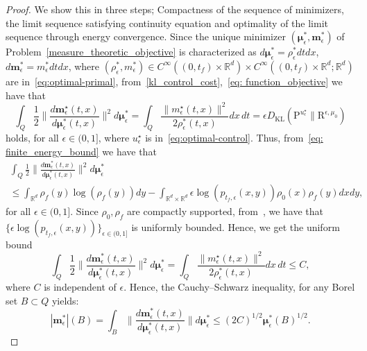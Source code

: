 \documentclass{amsart}
\numberwithin{equation}{section}
\newcommand{\R}{\mathbb{R}}
\newcommand{\KL}{D_{\mathrm{KL}}}
\begin{document}
\begin{proof}
 We show this in three steps; Compactness of the sequence of minimizers, the limit sequence satisfying continuity equation and optimality of the limit sequence through energy convergence. Since the unique minimizer $(\boldsymbol{\mu}_\epsilon^*, \mathbf{m}_\epsilon^*)$ of Problem~\eqref{measure_theoretic_objective} is characterized as $d\boldsymbol{\mu}_{\epsilon}^* = \rho_{\epsilon}^* dt dx$, $d\mathbf{m}_{\epsilon}^* = m_{\epsilon}^* dt dx$, where $(\rho_{\epsilon}^*,m_{\epsilon}^*)\in C^\infty((0,t_f)\times\R^d)\times C^\infty((0,t_f)\times\R^d;\R^d)$ are in~\eqref{eq:optimal-primal}, from~\eqref{kl_control_cost},~\eqref{eq: function_objective} we have that
\[
\int_Q \frac12\Big\|\frac{d\mathbf m_{\epsilon}^\star(t,x)}{d\boldsymbol\mu^*_\epsilon(t,x)}\Big\|^2 d\boldsymbol\mu^*_\epsilon=\int_Q  \frac{\|m_{\epsilon}^\star(t,x)\|^2}{2\rho_\epsilon^*(t,x)} dx\, dt =\epsilon\KL(\mathrm{P}^{u_\epsilon^\star} \| \mathrm{R}^{\epsilon,\mu_0})
\]
holds, for all $\epsilon\in (0,1]$, where $u_\epsilon^\star$ is in~\eqref{eq:optimal-control}. Thus, from~\eqref{eq: finite_energy_bound} we have that 
\begin{multline*}
\int_Q \frac12\Big\|\frac{d\mathbf m^*_\epsilon(t,x)}{d\boldsymbol\mu^*_\epsilon(t,x)}\Big\|^2 d\boldsymbol\mu^*_\epsilon\\\leq \int_{\R^d}\rho_f(y)\log(\rho_f(y))dy-\int_{\R^d\times\R^d}\epsilon\log(p_{t_f,\epsilon}(x,y))\rho_0(x)\rho_f(y)dxdy,    
\end{multline*}
 for all $\epsilon\in (0,1]$. Since $\rho_0,\rho_{f}$ are compactly supported, from~\cite[Theorem~19]{barilari2012small}, we have that $\{\epsilon\log(p_{t_f,\epsilon}(x,y))\}_{\epsilon\in(0,1]}$ is uniformly bounded. Hence, we get the uniform bound
 \begin{equation}
    \label{eq:uniform_energy_explicit}
    \int_Q \frac12\Big\|\frac{d\mathbf m^*_\epsilon(t,x)}{d\boldsymbol\mu^*_\epsilon(t,x)}\Big\|^2 d\boldsymbol\mu^*_\epsilon=\int_Q  \frac{\|m_{\epsilon}^\star(t,x)\|^2}{2\rho_\epsilon^*(t,x)} dx\, dt \leq C,
\end{equation}
where $C$ is independent of $\epsilon$. Hence, the Cauchy--Schwarz inequality, for any Borel set $B \subset Q$ yields:
\begin{equation}
    |\mathbf m^*_\epsilon|(B) = \int_B \Big\|\frac{d\mathbf m^*_\epsilon(t,x)}{d\boldsymbol\mu^*_\epsilon(t,x)}\Big\| d\boldsymbol\mu^*_\epsilon \leq \left( 2C \right)^{1/2} \boldsymbol\mu^*_\epsilon(B)^{1/2}.
\end{equation}

\end{proof}
\end{document}
